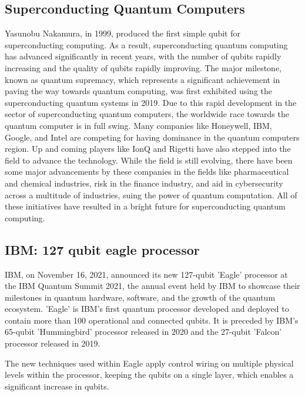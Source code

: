 \documentclass{article}
\begin{document}
\noindent
\subsection{Superconducting Quantum Computers}
\noindent
Yasunobu Nakamura, in 1999, produced the first simple qubit for superconducting computing. As a result, superconducting quantum computing has advanced significantly in recent years, with the number of qubits rapidly increasing and the quality of qubits rapidly improving. The major milestone, known as quantum supremacy, which represents a significant achievement in paving the way towards quantum computing, was first exhibited using the superconducting quantum systems in 2019. Due to this rapid development in the sector of superconducting quantum computers, the worldwide race towards the quantum computer is in full swing.\cite{huang2020superconducting}
Many companies like Honeywell, IBM, Google, and Intel are competing for having dominance in the quantum computers region. Up and coming players like IonQ and Rigetti have also stepped into the field to advance the technology. While the field is still evolving, there have been some major advancements by these companies in the fields like pharmaceutical and chemical industries, risk in the finance industry, and aid in cybersecurity across a multitude of industries, suing the power of quantum computation.   \cite{noauthor_quantum_nodate-2} 
All of these initiatives have resulted in a bright future for superconducting quantum computing. 



\vspace{5mm}

\subsection{IBM: 127 qubit eagle processor}
IBM, on November 16, 2021, announced its new 127-qubit 'Eagle' processor at the IBM Quantum Summit 2021, the annual event held by IBM to showcase their milestones in quantum hardware, software, and the growth of the quantum ecosystem. 'Eagle' is IBM's first quantum processor developed and deployed to contain more than 100 operational and connected qubits. It is preceded by IBM's 65-qubit 'Hummingbird' processor released in 2020 and the 27-qubit 'Falcon' processor released in 2019.

\noindent
The new techniques used within Eagle apply control wiring on multiple physical levels within the processor, keeping the qubits on a single layer, which enables a significant increase in qubits. \cite{noauthor_ibm_nodate}
\end{document}
